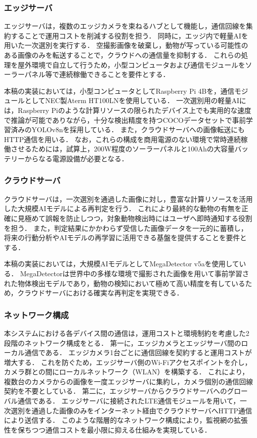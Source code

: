 \documentclass[technicalreport]{ieicej}
\begin{document}
\subsubsection{エッジサーバ}
エッジサーバは，複数のエッジカメラを束ねるハブとして機能し，通信回線を集約することで運用コストを削減する役割を担う．
同時に，エッジ内で軽量AIを用いた一次選別を実行する．
空撮影画像を破棄し，動物が写っている可能性のある画像のみを転送することで，クラウドへの通信量を抑制する．
これらの処理を屋外環境で自立して行うため，小型コンピュータおよび通信モジュールをソーラーパネル等で連続稼働できることを要件とする．

本稿の実装においては，小型コンピュータとしてRaspberry Pi 4Bを，通信モジュールとしてNEC製Aterm HT100LNを使用している．
一次選別用の軽量AIには，Raspberry Piのような計算リソースの限られたデバイス上でも実用的な速度で推論が可能でありながら，十分な検出精度を持つCOCOデータセットで事前学習済みのYOLOv8nを採用している．
また，クラウドサーバへの画像転送にもHTTP通信を用いる．
なお，これらの構成を商用電源のない環境で常時連続稼働させるためには，試算上，200W程度のソーラーパネルと100Ahの大容量バッテリーからなる電源設備が必要となる．

\subsubsection{クラウドサーバ}
クラウドサーバは，一次選別を通過した画像に対し，豊富な計算リソースを活用した大規模AIモデルによる再判定を行う．
これにより最終的な動物の有無を正確に見極めて誤報を防止しつつ，対象動物検出時にはユーザへ即時通知する役割を担う．
また，判定結果にかかわらず受信した画像データを一元的に蓄積し，将来の行動分析やAIモデルの再学習に活用できる基盤を提供することを要件とする．

本稿の実装においては，大規模AIモデルとしてMegaDetector v5aを使用している．
MegaDetectorは世界中の多様な環境で撮影された画像を用いて事前学習された物体検出モデルであり，動物の検知において極めて高い精度を有しているため，クラウドサーバにおける確実な再判定を実現できる．

\subsubsection{ネットワーク構成}
本システムにおける各デバイス間の通信は，運用コストと環境制約を考慮した2段階のネットワーク構成をとる．
第一に，エッジカメラとエッジサーバ間のローカル通信である．
エッジカメラ1台ごとに通信回線を契約すると運用コストが増大する．
これを防ぐため，エッジサーバ側のWi-Fiアクセスポイントを介し，カメラ群との間にローカルネットワーク（WLAN）を構築する．
これにより，複数台のカメラからの画像を一度エッジサーバに集約し，カメラ個別の通信回線契約を不要としている．
第二に，エッジサーバからクラウドサーバへのグローバル通信である．
エッジサーバに接続されたLTE通信モジュールを用いて，一次選別を通過した画像のみをインターネット経由でクラウドサーバへHTTP通信により送信する．
このような階層的なネットワーク構成により，監視網の拡張性を保ちつつ通信コストを最小限に抑える仕組みを実現している．
\end{document}
